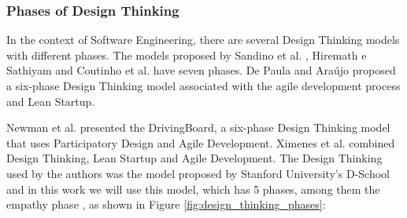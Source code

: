 \documentclass[conference]{IEEEtran}
\begin{document}
\subsubsection{Phases of Design Thinking}


In the context of Software Engineering, there are several Design Thinking models with different phases. The models proposed by Sandino et al. \cite{DBLP:conf/hci/SandinoMV13}, Hiremath e Sathiyam \cite{DBLP:conf/interact/HiremathS13} and Coutinho et al. \cite{DBLP:conf/eatis/CoutinhoGJ16} have seven phases. De Paula and Ara\'{u}jo \cite{DBLP:conf/hci/PaulaA16} proposed a six-phase Design Thinking model associated with the agile development process and Lean Startup.


Newman et al. \cite{DBLP:conf/icse/NewmanFSFFW15} presented the DrivingBoard, a six-phase Design Thinking model that uses Participatory Design and Agile Development. Ximenes et al.  \cite{DBLP:conf/hci/XimenesAA15} combined Design Thinking, Lean Startup and Agile Development. The Design Thinking used by the authors was the model proposed by Stanford University's D-School and in this work we will use this model, which has 5 phases, among them the empathy phase \cite{DBLP:conf/hci/XimenesAA15}, as shown in Figure \ref{fig:design_thinking_phases}:
\end{document}
